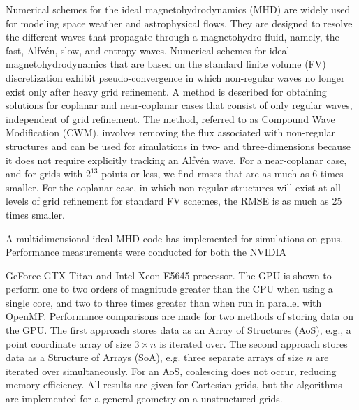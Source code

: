 \documentclass[11pt]{report}
\begin{document}
Numerical schemes for the ideal magnetohydrodynamics (MHD) are widely used for modeling space weather and astrophysical flows.  They are designed to resolve the different waves that propagate through a magnetohydro fluid, namely, the fast, Alfv{\'e}n, slow, and entropy waves.  Numerical schemes for ideal magnetohydrodynamics that are based on the standard finite volume (FV) discretization exhibit pseudo-convergence in which non-regular waves no longer exist only after heavy grid refinement.  A method is described for obtaining solutions for coplanar and near-coplanar cases that consist of only regular waves, independent of grid refinement.  The method, referred to as Compound Wave Modification (CWM), involves removing the flux associated with non-regular structures and can be used for simulations in two- and three-dimensions because it does not require explicitly tracking an Alfv{\'e}n wave.  For a near-coplanar case, and for grids with $2^{13}$ points or less, we find \glspl{rmse} that are as much as 6 times smaller.  For the coplanar case, in which non-regular structures will exist at all levels of grid refinement for standard FV schemes, the RMSE is as much as 25 times smaller.  
 
A multidimensional ideal MHD code has implemented for simulations on \glspl{gpu}.  Performance measurements were conducted for both the NVIDIA 

\abstractmultiplepage
\noindent GeForce GTX Titan and Intel Xeon E5645 processor. The GPU is shown to perform one to two orders of magnitude greater than the CPU when using a single core, and two to three times greater than when run in parallel with OpenMP.  Performance comparisons are made for two methods of storing data on the GPU.  The first approach stores data as an Array of Structures (AoS), e.g., a point coordinate array of size $3\times n$ is iterated over.  The second approach stores data as a Structure of Arrays (SoA), e.g. three separate arrays of size $n$ are iterated over simultaneously.  For an AoS, coalescing does not occur, reducing memory efficiency.    All results are given for Cartesian grids, but the algorithms are implemented for a general geometry on a unstructured grids.
\end{document}
